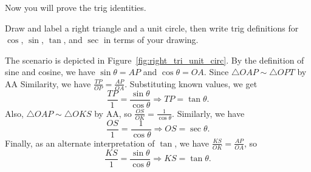 \documentclass[../gatm_answers.tex]{subfiles}
\begin{document}
\begin{outer_problem}
\item Now you will prove the trig identities.
\end{outer_problem}

\begin{inner_problem}
\item Draw and label a right triangle and a unit circle, then write trig definitions for $\cos$, $\sin$, $\tan$, and $\sec$ in terms of your drawing.
\end{inner_problem}

The scenario is depicted in Figure~\ref{fig:right_tri_unit_circ}. By the definition of sine and cosine, we have $\sin\theta=AP$ and $\cos\theta=OA$. Since $\triangle OAP \sim \triangle OPT$ by AA Similarity, we have $\frac{TP}{OP}=\frac{AP}{OA}$. Substituting known values, we get $$\frac{TP}{1}=\frac{\sin\theta}{\cos\theta}\Longrightarrow TP=\tan\theta.$$ Also, $\triangle OAP \sim \triangle OKS$ by AA, so $\frac{OS}{OK}=\frac{1}{\cos\theta}$. Similarly, we have $$\frac{OS}{1}=\frac{1}{\cos\theta}\Longrightarrow OS=\sec\theta.$$ Finally, as an alternate interpretation of $\tan$, we have $\frac{KS}{OK}=\frac{AP}{OA}$, so $$\frac{KS}{1}=\frac{\sin\theta}{\cos\theta}\Longrightarrow KS = \tan\theta.$$
\end{document}
